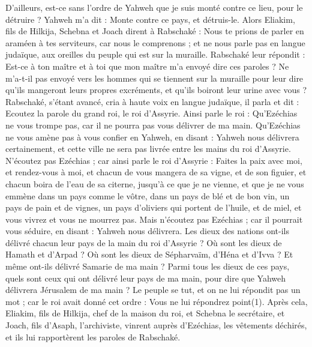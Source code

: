 \begin{multicols}{2}
D’ailleurs, est-ce sans l’ordre de Yahweh que je suis monté contre ce lieu, pour le détruire ? Yahweh m’a dit : Monte contre ce pays, et détruis-le.
Alors Eliakim, fils de Hilkija, Schebna et Joach dirent à Rabschaké : Nous te prions de parler en araméen à tes serviteurs, car nous le comprenons ; et ne nous parle pas en langue judaïque, aux oreilles du peuple qui est sur la muraille.
Rabschaké leur répondit : Est-ce à ton maître et à toi que mon maître m’a envoyé dire ces paroles ? Ne m’a-t-il pas envoyé vers les hommes qui se tiennent sur la muraille pour leur dire qu’ils mangeront leurs propres excréments, et qu’ils boiront leur urine avec vous ?
Rabschaké, s’étant avancé, cria à haute voix en langue judaïque, il parla et dit : Ecoutez la parole du grand roi, le roi d’Assyrie.
Ainsi parle le roi : Qu’Ezéchias ne vous trompe pas, car il ne pourra pas vous délivrer de ma main.
Qu’Ezéchias ne vous amène pas à vous confier en Yahweh, en disant : Yahweh nous délivrera certainement, et cette ville ne sera pas livrée entre les mains du roi d’Assyrie.
N’écoutez pas Ezéchias ; car ainsi parle le roi d’Assyrie : Faites la paix avec moi, et rendez-vous à moi, et chacun de vous mangera de sa vigne, et de son figuier, et chacun boira de l’eau de sa citerne,
jusqu’à ce que je ne vienne, et que je ne vous emmène dans un pays comme le vôtre, dans un pays de blé et de bon vin, un pays de pain et de vignes, un pays d’oliviers qui portent de l’huile, et de miel, et vous vivrez et vous ne mourrez pas. Mais n’écoutez pas Ezéchias ; car il pourrait vous séduire, en disant : Yahweh nous délivrera.
Les dieux des nations ont-ils délivré chacun leur pays de la main du roi d’Assyrie ?
Où sont les dieux de Hamath et d’Arpad ? Où sont les dieux de Sépharvaïm, d’Héna et d’Ivva ? Et même ont-ils délivré Samarie de ma main ?
Parmi tous les dieux de ces pays, quels sont ceux qui ont délivré leur pays de ma main, pour dire que Yahweh délivrera Jérusalem de ma main ?
Le peuple se tut, et on ne lui répondit pas un mot ; car le roi avait donné cet ordre : Vous ne lui répondrez point(1).
Après cela, Eliakim, fils de Hilkija, chef de la maison du roi, et Schebna le secrétaire, et Joach, fils d’Asaph, l’archiviste, vinrent auprès d’Ezéchias, les vêtements déchirés, et ils lui rapportèrent les paroles de Rabschaké.

\end{multicols}
